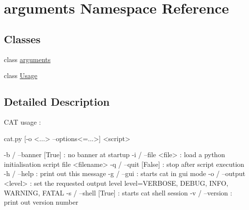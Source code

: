 \hypertarget{namespacearguments}{
\section{arguments Namespace Reference}
\label{namespacearguments}
}
\subsection*{Classes}
\begin{DoxyCompactItemize}
\item 
class \hyperlink{classarguments_1_1arguments}{arguments}
\item 
class \hyperlink{classarguments_1_1Usage}{Usage}
\end{DoxyCompactItemize}


\subsection{Detailed Description}
\begin{DoxyVerb}
CAT usage :

cat.py [-o <...> --options<=...>] <script>

  -b / --banner [True]   : no banner at startup
  -i / --file   <file>   : load a python initialisation script file <filename>
  -q / --quit   [False]  : stop after script execution
  -h / --help            : print out this message
  -g / --gui             : starts cat in gui mode
  -o / --output <level>  : set the requested output level
          level=VERBOSE, DEBUG, INFO, WARNING, FATAL
  -s / --shell  [True]  : starts cat shell session
  -v / --version         : print out version number
\end{DoxyVerb}
 